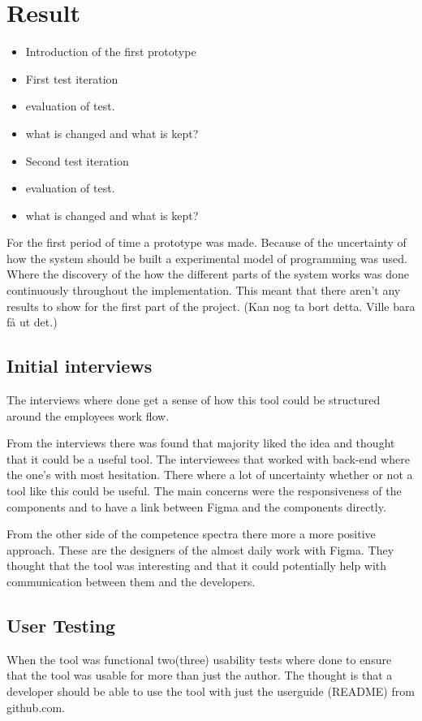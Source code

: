 \section{Result}
\begin{itemize}
   \item Introduction of the first prototype
   \item First test iteration 
      \item evaluation of test. 
      \item what is changed and what is kept?

   \item Second test iteration 
      \item evaluation of test. 
      \item what is changed and what is kept?
\end{itemize}

For the first period of time a prototype was made. Because of the uncertainty of how the system should be built a experimental model of programming was used. Where the discovery of the how the different parts of the system works was done continuously throughout the implementation. This meant that there aren't any results to show for the first part of the project. 
(Kan nog ta bort detta. Ville bara få ut det.)

\subsection{Initial interviews}%
\label{sub:Initial interviews}
The interviews where done get a sense of how this tool could be structured around the employees work flow.

From the interviews there was found that majority liked the idea and thought that it could be a useful tool. The interviewees that worked with back-end where the one's with most hesitation. There where a lot of uncertainty whether or not a tool like this could be useful. The main concerns were the responsiveness of the components and to have a link between Figma and the components directly.

From the other side of the competence spectra there more a more positive approach. These are the designers of the almost daily work with Figma. They thought that the tool was interesting and that it could potentially help with communication between them and the developers.


\subsection{User Testing}%
\label{sub:User Testing}
When the tool was functional two(three) usability tests where done to ensure that the tool was usable for more than just the author. The thought is that a developer should be able to use the tool with just the userguide (README) from github.com.

